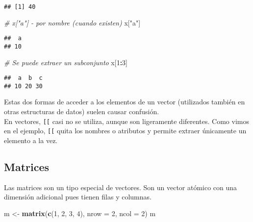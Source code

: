 \documentclass[]{article}
\newenvironment{Shaded}{\begin{snugshade}}{\end{snugshade}}
\newcommand{\KeywordTok}[1]{\textcolor[rgb]{0.13,0.29,0.53}{\textbf{#1}}}
\newcommand{\DataTypeTok}[1]{\textcolor[rgb]{0.13,0.29,0.53}{#1}}
\newcommand{\DecValTok}[1]{\textcolor[rgb]{0.00,0.00,0.81}{#1}}
\newcommand{\StringTok}[1]{\textcolor[rgb]{0.31,0.60,0.02}{#1}}
\newcommand{\CommentTok}[1]{\textcolor[rgb]{0.56,0.35,0.01}{\textit{#1}}}
\newcommand{\OperatorTok}[1]{\textcolor[rgb]{0.81,0.36,0.00}{\textbf{#1}}}
\newcommand{\NormalTok}[1]{#1}
\begin{document}
\begin{verbatim}
## [1] 40
\end{verbatim}

\begin{Shaded}
\begin{Highlighting}[]
\CommentTok{# x["a"] - por nombre (cuando existen)}
\NormalTok{x[}\StringTok{"a"}\NormalTok{]}
\end{Highlighting}
\end{Shaded}

\begin{verbatim}
##  a 
## 10
\end{verbatim}

\begin{Shaded}
\begin{Highlighting}[]
\CommentTok{# Se puede extraer un subconjunto}
\NormalTok{x[}\DecValTok{1}\OperatorTok{:}\DecValTok{3}\NormalTok{]}
\end{Highlighting}
\end{Shaded}

\begin{verbatim}
##  a  b  c 
## 10 20 30
\end{verbatim}

\begin{nota}
Estas dos formas de acceder a los elementos de un vector (utilizados también 
en otras estructuras de datos) suelen causar confusión.\\

En vectores, \texttt{[[} casi no se utiliza, aunque son ligeramente diferentes. Como 
vimos en el ejemplo, \texttt{[[} quita los nombres o atributos y permite extraer
únicamente un elemento a la vez.
\end{nota}

\subsection{Matrices}\label{matrices}

Las matrices son un tipo especial de vectores. Son un vector atómico con
una dimensión adicional pues tienen filas y columnas.

\begin{Shaded}
\begin{Highlighting}[]
\NormalTok{m <-}\StringTok{ }\KeywordTok{matrix}\NormalTok{(}\KeywordTok{c}\NormalTok{(}\DecValTok{1}\NormalTok{, }\DecValTok{2}\NormalTok{, }\DecValTok{3}\NormalTok{, }\DecValTok{4}\NormalTok{), }\DataTypeTok{nrow =} \DecValTok{2}\NormalTok{, }\DataTypeTok{ncol =} \DecValTok{2}\NormalTok{)}
\NormalTok{m}
\end{Highlighting}
\end{Shaded}
\end{document}
